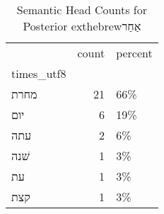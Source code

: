\begin{table}[htbp!]
\centering
\caption{Semantic Head Counts for Posterior 	exthebrew{אַחַר}}
\label{table:post_M_head_ct}
\begin{tabular}{lrl}
\toprule
{} &  count & percent \\
times\_utf8 &        &         \\
\midrule
מחרת       &     21 &     66\% \\
יום        &      6 &     19\% \\
עתה        &      2 &      6\% \\
שׁנה       &      1 &      3\% \\
עת         &      1 &      3\% \\
קצת        &      1 &      3\% \\
\bottomrule
\end{tabular}
\end{table}

